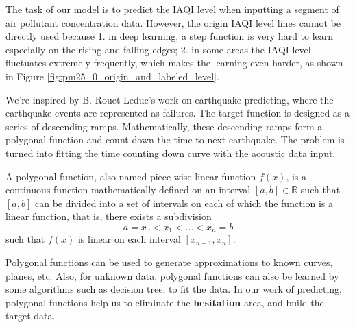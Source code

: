 \documentclass[sigconf]{acmart}
\begin{document}
The task of our model is to predict the IAQI level when inputting a segment of air pollutant concentration data. However, the origin IAQI level lines cannot be directly used because 1. in deep learning, a step function is very hard to learn especially on the rising and falling edges; 2. in some areas the IAQI level fluctuates extremely frequently, which makes the learning even harder, as shown in Figure \ref{fig:pm25_0_origin_and_labeled_level}.


We're inspired by B. Rouet-Leduc's work \cite{rouet2017machine} on earthquake predicting, where the earthquake events are represented as failures. The target function is designed as a series of descending ramps. Mathematically, these descending ramps form a polygonal function and count down the time to next earthquake. The problem is turned into fitting the time counting down curve with the acoustic data input.

A polygonal function, also named piece-wise linear function $f(x)$, is a continuous function mathematically defined on an interval $[a, b]\in \mathbb R$ such that $[a, b]$ can be divided into a set of intervals on each of which the function is a linear function, that is, there exists a subdivision 
\begin{equation}
    a=x_0 < x_1 < ... < x_n=b
\end{equation}
such that $f(x)$ is linear on each interval $[x_{n-1}, x_n]$.

Polygonal functions can be used to generate approximations to known curves, planes, etc. Also, for unknown data, polygonal functions can also be learned by some algorithms such as decision tree, to fit the data. In our work of predicting, polygonal functions help us to eliminate the \textbf{hesitation} area, and build the target data.
\end{document}
